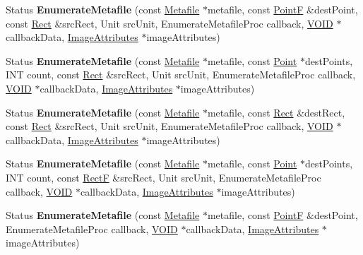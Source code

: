 \begin{DoxyCompactItemize}
Status {\bfseries Enumerate\+Metafile} (const \hyperlink{class_metafile}{Metafile} $\ast$metafile, const \hyperlink{struct_point_f}{PointF} \&dest\+Point, const \hyperlink{struct_rect}{Rect} \&src\+Rect, Unit src\+Unit, Enumerate\+Metafile\+Proc callback, \hyperlink{interfacevoid}{V\+O\+ID} $\ast$callback\+Data, \hyperlink{class_image_attributes}{Image\+Attributes} $\ast$image\+Attributes)
\item 
\mbox{\label{class_graphics_a68abc2fe24552cef03d1c9b0031534cc}} 
Status {\bfseries Enumerate\+Metafile} (const \hyperlink{class_metafile}{Metafile} $\ast$metafile, const \hyperlink{struct_point}{Point} $\ast$dest\+Points, I\+NT count, const \hyperlink{struct_rect}{Rect} \&src\+Rect, Unit src\+Unit, Enumerate\+Metafile\+Proc callback, \hyperlink{interfacevoid}{V\+O\+ID} $\ast$callback\+Data, \hyperlink{class_image_attributes}{Image\+Attributes} $\ast$image\+Attributes)
\item 
\mbox{\label{class_graphics_a24bdd562206f74d2b9c362e53c6717e2}} 
Status {\bfseries Enumerate\+Metafile} (const \hyperlink{class_metafile}{Metafile} $\ast$metafile, const \hyperlink{struct_rect}{Rect} \&dest\+Rect, const \hyperlink{struct_rect}{Rect} \&src\+Rect, Unit src\+Unit, Enumerate\+Metafile\+Proc callback, \hyperlink{interfacevoid}{V\+O\+ID} $\ast$callback\+Data, \hyperlink{class_image_attributes}{Image\+Attributes} $\ast$image\+Attributes)
\item 
\mbox{\label{class_graphics_a7a9e09cc34f422ebf435cd9f71be67ca}} 
Status {\bfseries Enumerate\+Metafile} (const \hyperlink{class_metafile}{Metafile} $\ast$metafile, const \hyperlink{struct_point}{Point} $\ast$dest\+Points, I\+NT count, const \hyperlink{struct_rect_f}{RectF} \&src\+Rect, Unit src\+Unit, Enumerate\+Metafile\+Proc callback, \hyperlink{interfacevoid}{V\+O\+ID} $\ast$callback\+Data, \hyperlink{class_image_attributes}{Image\+Attributes} $\ast$image\+Attributes)
\item 
\mbox{\label{class_graphics_a64d923260d8753cceaa8ce3e4f76ad5e}} 
Status {\bfseries Enumerate\+Metafile} (const \hyperlink{class_metafile}{Metafile} $\ast$metafile, const \hyperlink{struct_point_f}{PointF} \&dest\+Point, Enumerate\+Metafile\+Proc callback, \hyperlink{interfacevoid}{V\+O\+ID} $\ast$callback\+Data, \hyperlink{class_image_attributes}{Image\+Attributes} $\ast$image\+Attributes)

\end{DoxyCompactItemize}
